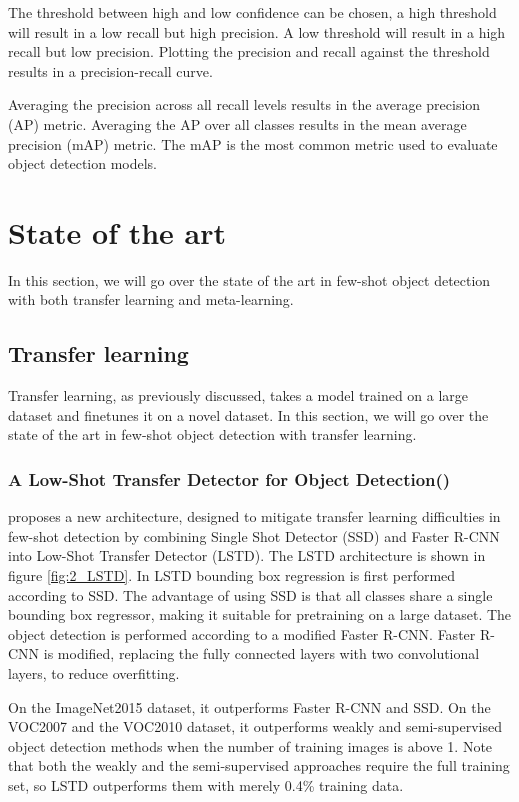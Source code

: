 The threshold between high and low confidence can be chosen, a high threshold will result in a low recall but high precision. A low threshold will result in a high recall but low precision. Plotting the precision and recall against the threshold results in a precision-recall curve.

Averaging the precision across all recall levels results in the average precision (AP) metric. Averaging the AP over all classes results in the mean average precision (mAP) metric. The mAP is the most common metric used to evaluate object detection models.

\section{State of the art}
In this section, we will go over the state of the art in few-shot object detection with both transfer learning and meta-learning.
\subsection{Transfer learning}
Transfer learning, as previously discussed, takes a model trained on a large dataset and finetunes it on a novel dataset. In this section, we will go over the state of the art in few-shot object detection with transfer learning.

\subsubsection{A Low-Shot Transfer Detector for Object Detection(\citet{LSTD})}
\citet{LSTD} proposes a new architecture, designed to mitigate transfer learning difficulties in few-shot detection by combining Single Shot Detector (SSD) and Faster R-CNN into Low-Shot Transfer Detector (LSTD). The LSTD architecture is shown in figure \ref{fig:2_LSTD}. In LSTD bounding box regression is first performed according to SSD. The advantage of using SSD is that all classes share a single bounding box regressor, making it suitable for pretraining on a large dataset. The object detection is performed according to a modified Faster R-CNN. Faster R-CNN is modified, replacing the fully connected layers with two convolutional layers, to reduce overfitting.

On the ImageNet2015 dataset, it outperforms Faster R-CNN and SSD. On the VOC2007 and the VOC2010 dataset, it outperforms weakly and semi-supervised object detection methods when the number of training images is above 1. Note that both the weakly and the semi-supervised approaches require the full training set, so LSTD outperforms them with merely 0.4\% training data.

